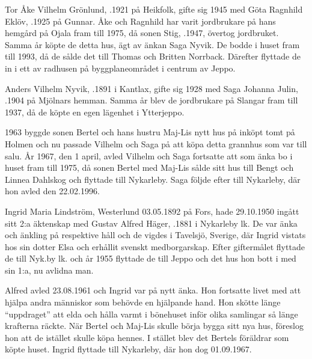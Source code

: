 Tor Åke Vilhelm Grönlund, .1921 på Heikfolk, gifte sig 1945 med Göta Ragnhild Eklöv, .1925 på Gunnar. Åke och Ragnhild har varit jordbrukare på hans hemgård på Ojala fram till 1975, då sonen Stig, .1947, övertog jordbruket. Samma år köpte de detta hus, ägt av änkan Saga Nyvik. De bodde i huset fram till 1993, då de sålde det till Thomas och Britten Norrback. Därefter flyttade de in i ett av radhusen på byggplaneområdet i centrum av Jeppo.


Anders Vilhelm Nyvik, .1891 i Kantlax, gifte sig 1928 med Saga Johanna Julin, .1904 på Mjölnars hemman. Samma år blev de jordbrukare på Slangar fram till 1937, då de köpte en egen lägenhet i Ytterjeppo.

1963 byggde sonen Bertel och hans hustru Maj-Lis nytt hus på inköpt tomt på Holmen och nu passade Vilhelm och Saga på att köpa detta grannhus som var till salu. År 1967, den 1 april, avled Vilhelm och Saga fortsatte att som änka bo i huset fram till 1975, då sonen Bertel med Maj-Lis sålde sitt hus till Bengt och Linnea Dahlskog och flyttade till Nykarleby. Saga följde efter till Nykarleby, där hon avled den 22.02.1996.


Ingrid Maria Lindström, \textborn Westerlund 03.05.1892 på Fors, hade 29.10.1950 ingått sitt 2:a äktenskap med Gustav Alfred Häger, .1881 i Nykarleby lk. De var änka och änkling på respektive håll och de vigdes i Tavelsjö, Sverige, där Ingrid vistats hos sin dotter Elsa och erhållit svenskt medborgarskap. Efter giftermålet flyttade de till Nyk.by lk. och år 1955 flyttade de till Jeppo och det hus hon bott i med sin 1:a, nu avlidna man.

Alfred avled 23.08.1961 och Ingrid var på nytt änka. Hon fortsatte livet med att hjälpa andra människor som behövde en hjälpande hand. Hon skötte länge ``uppdraget'' att elda och hålla varmt i bönehuset inför olika samlingar så länge krafterna räckte. När Bertel och Maj-Lis skulle börja bygga sitt nya hus, föreslog hon att de istället skulle köpa hennes. I stället blev det Bertels föräldrar som köpte huset. Ingrid flyttade till Nykarleby, där hon dog 01.09.1967.


